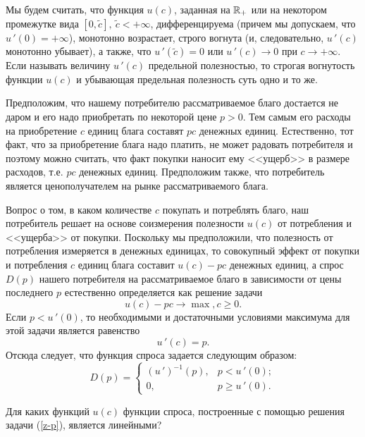     Мы будем считать, что функция $u(c)$, заданная на $\mathbb{R}_{+}$ или на некотором
    промежутке вида $[0,\tilde{c}], \ \tilde{c}<+\infty$, дифференцируема
    (причем
    мы допускаем, что $u\,'(0)=+\infty$), монотонно возрастает,
    строго вогнута (и, следовательно, $u\,'(c)$ монотонно убывает), а также,
    что $u\,'(\tilde{c})=0$ или $u\,'(c)\rightarrow 0$ при $c\rightarrow+\infty$. Если
    называть величину $u\,'(c)$ предельной полезностью, то строгая
    вогнутость функции $u(c)$ и убывающая предельная полезность суть
    одно и то же.

    Предположим, что нашему потребителю рассматриваемое
    благо достается не даром и его надо приобретать по некоторой
    цене $p>0$. Тем самым его расходы на приобретение $c$ единиц
    блага составят $pc$ денежных единиц. Естественно,
    тот факт, что за приобретение блага надо платить, не может
    радовать потребителя и поэтому можно считать, что факт покупки
    наносит ему <<ущерб>> в размере расходов, т.е. $pc$ денежных единиц.
    Предположим также, что потребитель является
    ценополучателем на рынке рассматриваемого блага.

    Вопрос о том, в каком количестве $c$ покупать и потреблять благо,
    наш потребитель решает на основе соизмерения полезности $u(c)$ от
    потребления и <<ущерба>> от покупки. Поскольку мы предположили,
    что полезность от потребления измеряется в денежных единицах, то
    совокупный эффект от покупки и потребления $c$ единиц блага
    составит $u(c)-pc$ денежных единиц, а спрос $D(p)$ нашего
    потребителя на рассматриваемое благо в зависимости от цены
    последнего $p$ естественно определяется как решение задачи
\begin{equation}
    \label{z-p}
    u(c)-pc\rightarrow\max, c\geqslant0.
\end{equation}
    Если $p<u\,'(0)$, то необходимыми и достаточными условиями
    максимума для этой задачи является равенство \[u\,'(c)=p.\]
    Отсюда следует, что функция спроса задается следующим образом:
\begin{equation}
    \label{f-sp-odn}
    D(p)=\left\{
             \begin{array}{ll}
               (u\,')^{-1}(p), & {p<u\,'(0);} \\
               0, & {p\geqslant u\,'(0).}
             \end{array}
           \right.
\end{equation}


\begin{exer}
    Для каких функций $u(c)$ функции спроса, построенные с помощью
    решения задачи (\ref{z-p}), является линейными?
\end{exer}

